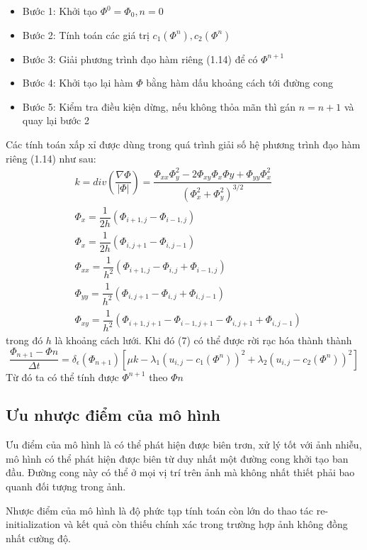 \documentclass[12pt,oneside,a4]{report}
\begin{document}
\begin{itemize}
\item Bước 1: Khởi tạo $\Phi^0=\Phi_0, n=0$
\item Bước 2: Tính toán các giá trị $c_1(\Phi^n), c_2(\Phi^n)$
\item Bước 3: Giải phương trình đạo hàm riêng (1.14) để có $\Phi^{n+1}$
\item Bước 4: Khởi tạo lại hàm $\Phi$ bằng hàm dấu khoảng cách tới đường cong
\item Bước 5: Kiểm tra điều kiện dừng, nếu không thỏa mãn thì gán $n=n+1$ và quay lại bước 2
\end{itemize}
Các tính toán xấp xỉ được dùng trong quá trình giải số hệ phương trình đạo hàm riêng (1.14) như sau:
\begin{equation}
\begin{split}
&k=div(\dfrac{\nabla \Phi}{|\Phi|})=\dfrac{\Phi_{xx}\Phi^2_{y}-2\Phi_{xy}\Phi_{x}\Phi{y}+\Phi_{yy}\Phi^2_{x}}{(\Phi^2_x+\Phi^2_y)^{3/2}}\\
&\Phi_x= \dfrac{1}{2h}(\Phi_{i+1,j}-\Phi_{i-1,j}) \\ 
&\Phi_x= \dfrac{1}{2h}(\Phi_{i,j+1}-\Phi_{i,j-1}) \\
&\Phi_{xx}= \dfrac{1}{h^2}(\Phi_{i+1,j}-\Phi_{i,j}+\Phi_{i-1,j}) \\
&\Phi_{yy}= \dfrac{1}{h^2}(\Phi_{i,j+1}-\Phi_{i,j}+\Phi_{i,j-1}) \\
&\Phi_{xy}= \dfrac{1}{h^2}(\Phi_{i+1,j+1}-\Phi_{i-1,j+1}-\Phi_{i,j+1}+\Phi_{i,j-1}) 
\end{split}
\end{equation}
trong đó $h$ là khoảng cách lưới. Khi đó (7) có thể được rời rạc hóa thành thành
\begin{equation}
\dfrac{\Phi_{n+1}-\Phi{n}}{\Delta t}=\delta_{\epsilon}(\Phi_{n+1})[\mu k-\lambda_1 (u_{i,j}-c_1(\Phi^{n}))^2+\lambda_2 (u_{i,j}-c_2(\Phi^{n}))^2]
\end{equation}
Từ đó ta có thể tính được $\Phi^{n+1}$ theo $\Phi{n}$
\subsection{Ưu nhược điểm của mô hình}
\hspace{0.5cm}Ưu điểm của mô hình là có thể phát hiện được biên trơn, xử lý tốt với ảnh nhiễu, mô hình có thể phát hiện được biên từ duy nhất một đường cong khởi tạo ban đầu. Đường cong này có thể ở mọi vị trí trên ảnh mà không nhất thiết phải bao quanh đối tượng trong ảnh.

Nhược điểm của mô hình  là độ phức tạp tính toán còn lớn do thao tác re-initialization và kết quả còn thiếu chính xác trong trường hợp ảnh không đồng nhất cường độ.
\end{document}
